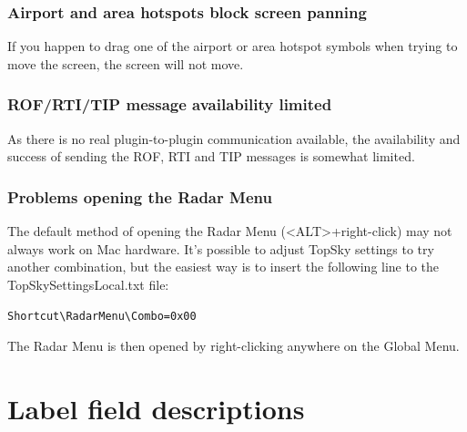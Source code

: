 \documentclass[11pt,a4paper]{memoir}
\begin{document}
\subsection*{Airport and area hotspots block screen panning}

If you happen to drag one of the airport or area hotspot symbols when trying to move the screen, the screen will not move.

\subsection*{ROF/RTI/TIP message availability limited}

As there is no real plugin-to-plugin communication available, the availability and success of sending the ROF, RTI and TIP messages is somewhat limited.

\subsection*{Problems opening the Radar Menu}

The default method of opening the Radar Menu (<ALT>+right-click) may not always work on Mac hardware. It’s possible to adjust TopSky settings to try another combination, but the easiest way is to insert the following line to the TopSkySettingsLocal.txt file:

\verb|Shortcut\RadarMenu\Combo=0x00|

The Radar Menu is then opened by right-clicking anywhere on the Global Menu.

\appendix
\chapter{Label field descriptions}
\end{document}
